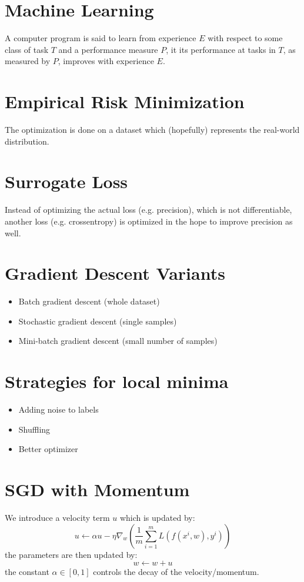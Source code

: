 \section{Machine Learning}
A computer program is said to learn from experience $E$ with respect to some class
of task $T$ and a performance measure $P$, it its performance at tasks in $T$, as
measured by $P$, improves with experience $E$.

\section{Empirical Risk Minimization}
The optimization is done on a dataset which (hopefully) represents the real-world distribution.

\section{Surrogate Loss}
Instead of optimizing the actual loss (e.g. precision), which is not differentiable, another loss (e.g. crossentropy)
is optimized in the hope to improve precision as well.

\section{Gradient Descent Variants}
\begin{itemize}
    \item Batch gradient descent (whole dataset)
    \item Stochastic gradient descent (single samples)
    \item Mini-batch gradient descent (small number of samples)
\end{itemize}

\section{Strategies for local minima}
\begin{itemize}
    \item Adding noise to labels
    \item Shuffling
    \item Better optimizer
\end{itemize}

\section{SGD with Momentum}
We introduce a velocity term $u$ which is updated by:
\begin{equation}
    u \leftarrow \alpha u - \eta \nabla_w \left( \frac{1}{m} \sum_{i=1}^m L(f(x^i, w), y^i)\right)
\end{equation}
the parameters are then updated by:
\begin{equation}
    w \leftarrow w + u
\end{equation}
the constant $\alpha \in [0, 1]$ controls the decay of the velocity/momentum.


